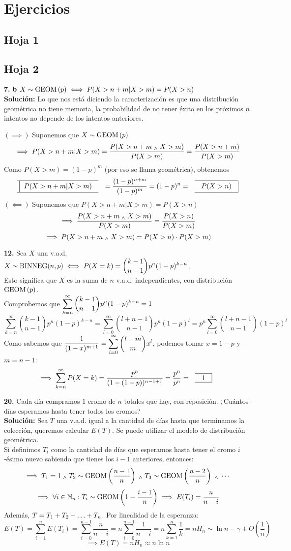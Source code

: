 \section{Ejercicios}
\subsection{Hoja 1}
\subsection{Hoja 2}

\textbf{7.}
\textbf{b} $\displaystyle X\sim\operatorname{GEOM}\left(p\right) \iff P(X>n+m|X>m) = P(X>n)$ \\
\textbf{Solución:} Lo que nos está diciendo la caracterización es que una distribución geométrica no tiene memoria, la probabilidad de no tener éxito en los próximos $n$ intentos no depende de los intentos anteriores.
\begin{dem}
	$(\implies)$ Suponemos que $X\sim\operatorname{GEOM}\left(p\right)$
	\[\implies P(X>n+m|X>m)=\frac{P(X>n+m \; _{\wedge} \; X>m)}{P(X>m)}=\frac{P(X>n+m)}{P(X>m)}\]
	Como $P(X>m)=(1-p)^m$ (por eso se llama geométrica), obtenemos
	\[\lbox{P(X>n+m|X>m)}=\frac{(1-p)^{n+m}}{(1-p)^m}=(1-p)^n=\rbox{P(X>n)}\]
	$(\impliedby)$ Suponemos que $P(X>n+m|X>m) = P(X>n)$
	\[\implies \frac{P(X>n+m \; _{\wedge} \; X>m)}{P(X>m)} = \frac{P(X>n)}{P(X>m)} \]
	\[\implies P(X>n+m \; _{\wedge} \; X>m) = P(X>n)\cdot P(X>m)\]
\end{dem}

\textbf{12.} Sea $X$ una v.a.d, $\displaystyle X\sim\operatorname{BINNEG}(n,p) \iff P(X=k)=\binom{k-1}{n-1}p^n(1-p)^{k-n}$.\\
Esto significa que $X$ es la suma de $n$ v.a.d. independientes, con distribución $\operatorname{GEOM}\left(p\right)$.\\
Comprobemos que $\displaystyle \sum_{k=n}^{\infty}\binom{k-1}{n-1}p^n(1-p)^{k-n} = 1$
\[\sum_{k=n}^{\infty}\binom{k-1}{n-1}p^n(1-p)^{k-n} = \sum_{l=0}^{\infty} \binom{l+n-1}{n-1}p^n(1-p)^l = p^n\sum_{l=0}^{\infty} \binom{l+n-1}{n-1}(1-p)^l\]
Como sabemos que $\displaystyle \frac{1}{(1-x)^{m+1}} = \sum_{l=0}^{\infty} \binom{l+m}{m}x^l$, podemos tomar $x=1-p$ y $m=n-1$:
\[\implies \sum_{k=n}^{\infty} P(X=k) = \frac{p^n}{(1-(1-p))^{n-1+1}} = \frac{p^n}{p^n} = \rbox{1}\]

\textbf{20.} Cada día compramos $1$ cromo de $n$ totales que hay, con reposición. ¿Cuántos días esperamos hasta tener todos los cromos?\\
\textbf{Solución:} Sea $T$ una v.a.d. igual a la cantidad de días hasta que terminamos la colección, queremos calcular $E(T)$. Se puede utilizar el modelo de distribución geométrica. \\
Si definimos $T_i$ como la cantidad de días que esperamos hasta tener el cromo $i$-ésimo nuevo sabiendo que tienes los $i-1$ anteriores, entonces:
\[\implies T_1 = 1 \; _{\wedge} \; T_2 \sim\operatorname{GEOM}\left(\frac{n-1}{n}\right) \; _{\wedge} \; T_3 \sim\operatorname{GEOM}\left(\frac{n-2}{n}\right)\; _{\wedge} \; \cdots\]
\[\implies \forall i \in \mathbb{N}_n : T_i\sim\operatorname{GEOM}\left(1-\frac{i-1}{n}\right) \implies E(T_i)=\frac{n}{n-i}\]
Además, $\displaystyle T = T_1 + T_2 + \ldots + T_n$. Por linealidad de la esperanza:
\[E(T) = \sum_{i=1}^{n} E(T_i) = \sum_{i=0}^{n-1} \frac{n}{n-i} = n\sum_{i=0}^{n-1} \frac{1}{n-i} = n\sum_{k=1}^{n} \frac{1}{k} = nH_{n} \sim \ln{n}-\gamma + O\left(\frac{1}{n}\right)\]
\[\implies E(T)=nH_n \approx n\ln{n}\]
